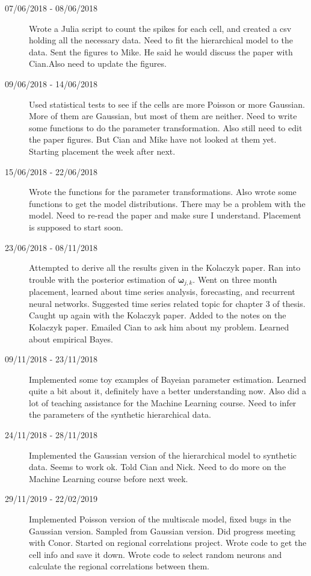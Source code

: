 \documentclass[a4paper,12pt]{article}
\theoremstyle{definition}
\begin{document}
\begin{description}
	\item[07/06/2018 - 08/06/2018] Wrote a Julia script to count the spikes for each cell, and created a csv holding all the necessary data. Need to fit the hierarchical model to the data. Sent the figures to Mike. He said he would discuss the paper with Cian.Also need to update the figures.

	\item[09/06/2018 - 14/06/2018] Used statistical tests to see if the cells are more Poisson or more Gaussian. More of them are Gaussian, but most of them are neither. Need to write some functions to do the parameter transformation. Also still need to edit the paper figures. But Cian and Mike have not looked at them yet. Starting placement the week after next.

	\item[15/06/2018 - 22/06/2018] Wrote the functions for the parameter transformations. Also wrote some functions to get the model distributions. There may be a problem with the model. Need to re-read the paper and make sure I understand. Placement is supposed to start soon.

	\item[23/06/2018 - 08/11/2018] Attempted to derive all the results given in the Kolaczyk paper. Ran into trouble with the posterior estimation of $\boldsymbol{\omega}_{j,k}$. Went on three month placement, learned about time series analysis, forecasting, and recurrent neural networks. Suggested time series related topic for chapter 3 of thesis. Caught up again with the Kolaczyk paper. Added to the notes on the Kolaczyk paper. Emailed Cian to ask him about my problem. Learned about empirical Bayes.

	\item[09/11/2018 - 23/11/2018] Implemented some toy examples of Bayeian parameter estimation. Learned quite a bit about it, definitely have a better understanding now. Also did a lot of teaching assistance for the Machine Learning course. Need to infer the parameters of the synthetic hierarchical data.

	\item[24/11/2018 - 28/11/2018] Implemented the Gaussian version of the hierarchical model to synthetic data. Seems to work ok. Told Cian and Nick. Need to do more on the Machine Learning course before next week.

	\item[29/11/2019 - 22/02/2019] Implemented Poisson version of the multiscale model, fixed bugs in the Gaussian version. Sampled from Gaussian version. Did progress meeting with Conor. Started on regional correlations project. Wrote code to get the cell info and save it down. Wrote code to select random neurons and calculate the regional correlations between them.


\end{description}
\end{document}
